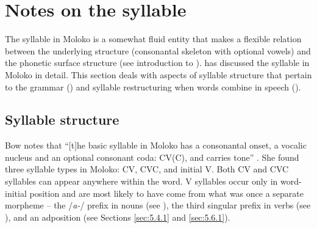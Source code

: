 \begin{table}
\caption{High tone lowering at morpheme boundaries\label{tab:2.14}}
\end{table}

\section{Notes on the syllable}\label{sec:2.5}
\hypertarget{RefHeading1210681525720847}{}
The syllable in Moloko is a somewhat fluid entity that makes a flexible relation between the underlying structure (consonantal skeleton with optional vowels) and the phonetic surface structure (see introduction to ). \citet{Bow1997c} has discussed the syllable in Moloko in detail. This section deals with aspects of syllable structure that pertain to the grammar () and syllable restructuring when words combine in speech (). 

\subsection{Syllable structure}\label{sec:2.5.1}
\hypertarget{RefHeading1210701525720847}{}
Bow notes that “[t]he basic syllable in Moloko has a consonantal onset, a vocalic nucleus and an optional consonant coda: CV(C), and carries tone” \citep[1]{Bow1997c}. She found three syllable types in Moloko:  CV, CVC, and initial V.  Both CV and CVC syllables can appear anywhere within the word. V syllables occur only in word-initial position and are most likely to have come from what was once a separate morpheme -- the /\textit{a-}/ prefix in nouns (see ), the third singular prefix in verbs (see ), and an adposition (see Sections \ref{sec:5.4.1} and \ref{sec:5.6.1}).

